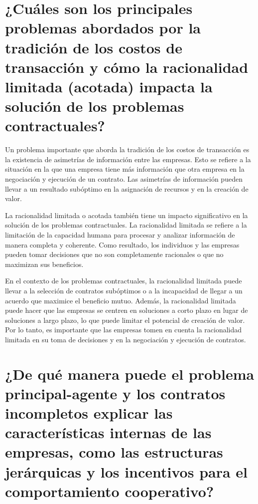 \documentclass[11pt]{article}
\begin{document}
\section{¿Cuáles son los principales problemas abordados por la tradición de los costos de transacción y cómo la racionalidad limitada (acotada) impacta la solución de los problemas contractuales? }

\begin{flushleft}
    Un problema importante que aborda la tradición de los costos de transacción es la existencia de asimetrías de información entre las empresas. Esto se refiere a la situación en la que una empresa tiene más información que otra empresa en la negociación y ejecución de un contrato. Las asimetrías de información pueden llevar a un resultado subóptimo en la asignación de recursos y en la creación de valor.

    La racionalidad limitada o acotada también tiene un impacto significativo en la solución de los problemas contractuales. La racionalidad limitada se refiere a la limitación de la capacidad humana para procesar y analizar información de manera completa y coherente. Como resultado, los individuos y las empresas pueden tomar decisiones que no son completamente racionales o que no maximizan sus beneficios.

    En el contexto de los problemas contractuales, la racionalidad limitada puede llevar a la selección de contratos subóptimos o a la incapacidad de llegar a un acuerdo que maximice el beneficio mutuo. Además, la racionalidad limitada puede hacer que las empresas se centren en soluciones a corto plazo en lugar de soluciones a largo plazo, lo que puede limitar el potencial de creación de valor. Por lo tanto, es importante que las empresas tomen en cuenta la racionalidad limitada en su toma de decisiones y en la negociación y ejecución de contratos.
\end{flushleft}

\section{¿De qué manera puede el problema principal-agente y los contratos incompletos explicar las características internas de las empresas, como las estructuras jerárquicas y los incentivos para el comportamiento cooperativo?}
\end{document}
